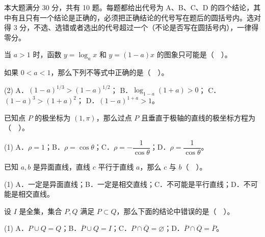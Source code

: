 本大题满分 30 分，共有 10 题。每题都给出代号为 A、B、C、D 的四个结论，其中有且只有一个结论是正确的，必须把正确结论的代号写在题后的圆括号内。选对得 3 分，不选、选错或者选出的代号超过一个（不论是否写在圆括号内），一律得零分。

\Needspace{0.4\textheight}
\begin{question}
当 $a>1$ 时，函数 $y=\log_a x$ 和 $y=(1-a)x$ 的图象只可能是（　）。
\nopagebreak[4]
\begin{center}\end{center}
\nopagebreak[4]
\end{question}
\begin{question}
如果 $0<a<1$，那么下列不等式中正确的是（　）。

\begin{gkopts}(2)
\task A．$(1-a)^{1/3}>(1-a)^{1/2}$；
\task B．$\log_{1-a}(1+a)>0$；
\task C．$(1-a)^3>(1+a)^2$；
\task D．$(1-a)^{1+a}>1$。
\end{gkopts}

\end{question}
\begin{question}
已知点 $P$ 的极坐标为 $(1,\pi)$，那么过点 $P$ 且垂直于极轴的直线的极坐标方程为（　）。

\begin{gkopts}(1)
\task A．$\rho=1$；B．$\rho=\cos\theta$；C．$\rho=-\dfrac1{\cos\theta}$；D．$\rho=\dfrac1{\cos\theta}$。
\end{gkopts}

\end{question}
\begin{question}
已知 $a,b$ 是异面直线，直线 $c$ 平行于直线 $a$，那么 $c$ 与 $b$（　）。

\begin{gkopts}(1)
\task A．一定是异面直线；B．一定是相交直线；C．不可能是平行直线；D．不可能是相交直线。
\end{gkopts}

\end{question}
\begin{question}
设 $I$ 是全集，集合 $P,Q$ 满足 $P\subset Q$，那么下面的结论中错误的是（　）。

\begin{gkopts}(1)
\task A．$P\cup Q=Q$；B．$\overline P\cup Q=I$；C．$P\cap\overline Q=\varnothing$；D．$\overline P\cap\overline Q=\overline P$。
\end{gkopts}

\end{question}
